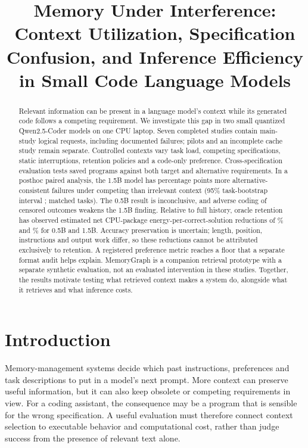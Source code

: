\documentclass[10pt,a4paper,twocolumn]{article}
\title{\vspace{-1cm}Memory Under Interference:\\Context Utilization, Specification Confusion, and Inference Efficiency in Small Code Language Models}
\author{}
\date{}
\begin{document}
\maketitle
\begin{abstract}
Relevant information can be present in a language model's context while its
generated code follows a competing requirement. We investigate this gap in two
small quantized Qwen2.5-Coder models on one CPU laptop. Seven completed studies
contain \MainRequests{} main-study logical requests, including documented
failures; pilots and an incomplete cache study remain separate. Controlled
contexts vary task load, competing specifications, static interruptions,
retention policies and a code-only preference. Cross-specification evaluation
tests saved programs against both target and alternative requirements. In a
posthoc paired analysis, the 1.5B model has \LargeCross{} percentage points more
alternative-consistent failures under competing than irrelevant context
(95\% task-bootstrap interval \LargeCrossCI{}; \LargeCrossN{} matched tasks).
The 0.5B result is inconclusive, and adverse coding of censored outcomes weakens
the 1.5B finding. Relative to full history, oracle retention has observed
estimated net CPU-package energy-per-correct-solution reductions of
\SmallEnergyReduction\% and \LargeEnergyReduction\% for 0.5B and 1.5B.
Accuracy preservation is uncertain; length, position, instructions and output
work differ, so these reductions cannot be attributed exclusively to retention.
A registered preference metric reaches a floor that a separate format audit
helps explain. MemoryGraph is a companion retrieval prototype with a separate
synthetic evaluation, not an evaluated intervention in these studies. Together,
the results motivate testing what retrieved context makes a system do, alongside
what it retrieves and what inference costs.
\end{abstract}

\section{Introduction}
Memory-management systems decide which past instructions, preferences and task
descriptions to put in a model's next prompt. More context can preserve useful
information, but it can also keep obsolete or competing requirements in view.
For a coding assistant, the consequence may be a program that is sensible for
the wrong specification. A useful evaluation must therefore connect context
selection to executable behavior and computational cost, rather than judge
success from the presence of relevant text alone.
\end{document}
